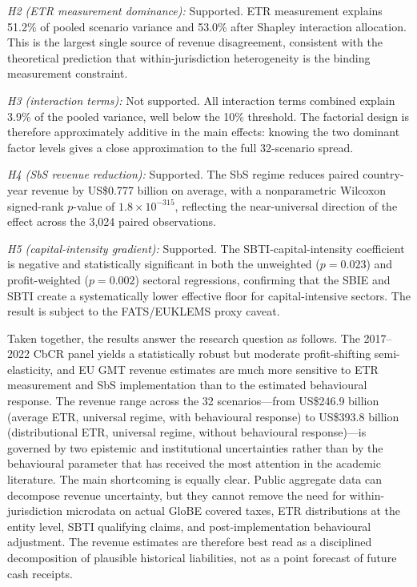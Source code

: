 \documentclass[11pt,a4paper]{article}
\begin{document}
\textit{H2 (ETR measurement dominance):} Supported. ETR measurement explains 51.2\% of pooled scenario variance and 53.0\% after Shapley interaction allocation. This is the largest single source of revenue disagreement, consistent with the theoretical prediction that within-jurisdiction heterogeneity {\citep{hugger2026}} is the binding measurement constraint.

\textit{H3 (interaction terms):} Not supported. All interaction terms combined explain 3.9\% of the pooled variance, well below the 10\% threshold. The factorial design is therefore approximately additive in the main effects: knowing the two dominant factor levels gives a close approximation to the full 32-scenario spread.

\textit{H4 (SbS revenue reduction):} Supported. The SbS regime reduces paired country-year revenue by US\$0.777 billion on average, with a nonparametric Wilcoxon signed-rank $p$-value of $1.8 \times 10^{-315}$, reflecting the near-universal direction of the effect across the 3{,}024 paired observations.

\textit{H5 (capital-intensity gradient):} Supported. The SBTI-capital-intensity coefficient is negative and statistically significant in both the unweighted ($p = 0.023$) and profit-weighted ($p = 0.002$) sectoral regressions, confirming that the SBIE and SBTI create a systematically lower effective floor for capital-intensive sectors. The result is subject to the FATS/EUKLEMS proxy caveat.

Taken together, the results answer the research question as follows. The 2017--2022 CbCR panel yields a statistically robust but moderate profit-shifting semi-elasticity, and EU GMT revenue estimates are much more sensitive to ETR measurement and SbS implementation than to the estimated behavioural response. The revenue range across the 32 scenarios---from US\$246.9 billion (average ETR, universal regime, with behavioural response) to US\$393.8 billion (distributional ETR, universal regime, without behavioural response)---is governed by two epistemic and institutional uncertainties rather than by the behavioural parameter that has received the most attention in the academic literature. The main shortcoming is equally clear. Public aggregate data can decompose revenue uncertainty, but they cannot remove the need for within-jurisdiction microdata on actual GloBE covered taxes, ETR distributions at the entity level, SBTI qualifying claims, and post-implementation behavioural adjustment. The revenue estimates are therefore best read as a disciplined decomposition of plausible historical liabilities, not as a point forecast of future cash receipts.
\end{document}
